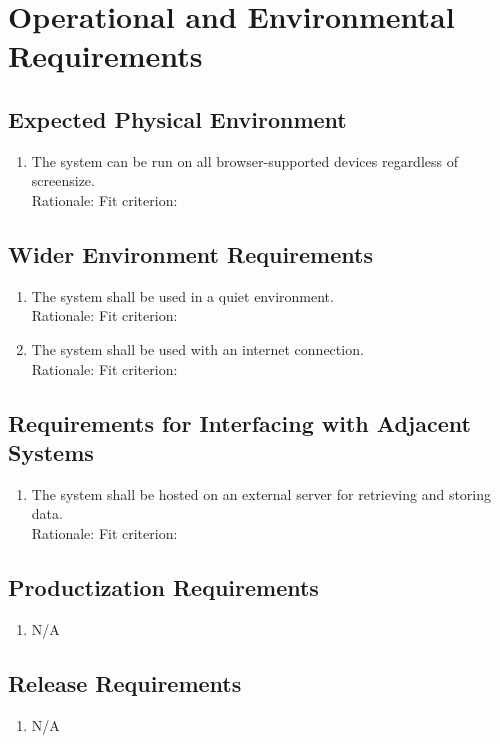 \documentclass[12pt]{article}
\begin{document}
\section{Operational and Environmental Requirements}
\subsection{Expected Physical Environment}
\begin{enumerate}[{OE-EPE}1. ]
  \item The system can be run on all browser-supported devices regardless of screensize.\\
  Rationale: 
  Fit criterion: 
\end{enumerate}
\subsection{Wider Environment Requirements}
\begin{enumerate}[{OE-WE}1. ]
  \item The system shall be used in a quiet environment.\\
  Rationale: 
  Fit criterion: 
  \item The system shall be used with an internet connection.\\
  Rationale: 
  Fit criterion: 
\end{enumerate}
\subsection{Requirements for Interfacing with Adjacent Systems}
\begin{enumerate}[{OE-IA}1. ]
  \item The system shall be hosted on an external server for retrieving and storing data.\\
  Rationale: 
  Fit criterion: 
\end{enumerate}
\subsection{Productization Requirements}
\begin{enumerate}[{OE-P}1. ]
  \item N/A
\end{enumerate}
\subsection{Release Requirements}
\begin{enumerate}[{OE-R}1. ]
  \item N/A
\end{enumerate}
\end{document}
